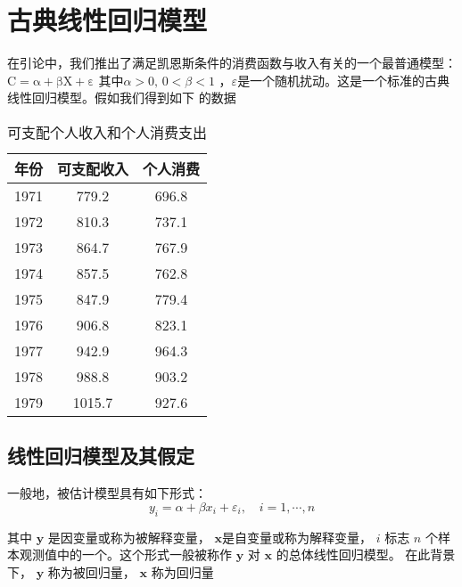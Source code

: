 \chapter{古典线性回归模型}

在引论中，我们推出了满足凯恩斯条件的消费函数与收入有关的一个最普通模型：$ \mathrm{C = \alpha + \beta X +\varepsilon} $
其中$ \alpha > 0 , \, 0 < \beta <1$ ，$ \varepsilon$是一个随机扰动。这是一个标准的古典线性回归模型。假如我们得到如下 的数据

\begin{table}[htb!]
    \centering
    \setlength{\tabcolsep}{3em}
    \caption{可支配个人收入和个人消费支出}
        \begin{tabular}{c  c  c}
            \toprule
            年份 & 可支配收入 & 个人消费 \\
            \midrule
            1971 & 779.2 & 696.8 \\
            1972 & 810.3 & 737.1 \\
            1973 & 864.7 & 767.9 \\
            1974 & 857.5 & 762.8 \\
            1975 & 847.9 & 779.4 \\
            1976 & 906.8 & 823.1 \\
            1977 & 942.9 & 964.3 \\
            1978 & 988.8 & 903.2 \\
            1979 & 1015.7 & 927.6 \\
            \bottomrule     
        \end{tabular} 
        \label{tab:4.1}     
\end{table}

\section{线性回归模型及其假定}

一般地，被估计模型具有如下形式：
$$
y_{i}=\alpha+\beta x_{i}+\varepsilon_{i}, \quad i=1, \cdots, n
$$

其中 $\boldsymbol{y}$ 是因变量或称为被解释变量， $\boldsymbol{ x} $是自变量或称为解释变量， 
$i$ 标志 $n$ 个样本观测值中的一个。这个形式一般被称作 $\boldsymbol{y}$ 对 $\boldsymbol{x}$ 的总体线性回归模型。
在此背景下， $\boldsymbol{y}$ 称为被回归量， $\boldsymbol{x}$ 称为回归量

